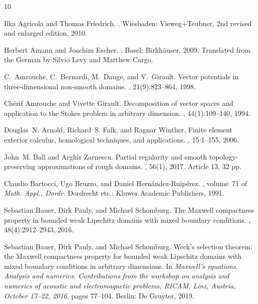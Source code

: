 \documentclass[10pt,a4paper]{amsart}
\theoremstyle{definition}
\theoremstyle{remark}
\numberwithin{equation}{section}
\begin{document}
\begin{thebibliography}{10}

Ilka Agricola and Thomas Friedrich.
.
\newblock Wiesbaden: Vieweg+Teubner, 2nd revised and enlarged edition, 2010.

Herbert Amann and Joachim Escher.
.
\newblock Basel: Birkh{\"a}user, 2009.
\newblock Translated from the German by Silvio Levy and Matthew Cargo.

C.~Amrouche, C.~Bernardi, M.~Dauge, and V.~Girault.
\newblock Vector potentials in three-dimensional non-smooth domains.
, 21(9):823--864, 1998.

Ch{\'e}rif Amrouche and Vivette Girault.
\newblock Decomposition of vector spaces and application to the {Stokes}
  problem in arbitrary dimension.
, 44(1):109--140, 1994.

Douglas~N. Arnold, Richard~S. Falk, and Ragnar Winther.
\newblock Finite element exterior calculus, homological techniques, and
  applications.
, 15:1--155, 2006.

John~M. Ball and Arghir Zarnescu.
\newblock Partial regularity and smooth topology-preserving approximations of
  rough domains.
, 56(1), 2017.
\newblock Article 13, 32 pp.

Claudio Bartocci, Ugo Bruzzo, and Daniel Hern{\'a}ndez-Ruip{\'e}rez.
, volume~71 of {\em Math. Appl.,
  Dordr.}
\newblock Dordrecht etc.: Kluwer Academic Publishers, 1991.

Sebastian Bauer, Dirk Pauly, and Michael Schomburg.
\newblock The {Maxwell} compactness property in bounded weak {Lipschitz}
  domains with mixed boundary conditions.
, 48(4):2912--2943, 2016.

Sebastian Bauer, Dirk Pauly, and Michael Schomburg.
\newblock Weck's selection theorem: the {Maxwell} compactness property for
  bounded weak {Lipschitz} domains with mixed boundary conditions in arbitrary
  dimensions.
\newblock In {\em Maxwell's equations. Analysis and numerics. Contributions
  from the workshop on analysis and numerics of acoustic and electromagnetic
  problems, RICAM, Linz, Austria, October 17--22, 2016}, pages 77--104. Berlin:
  De Gruyter, 2019.


\end{thebibliography}
\end{document}
